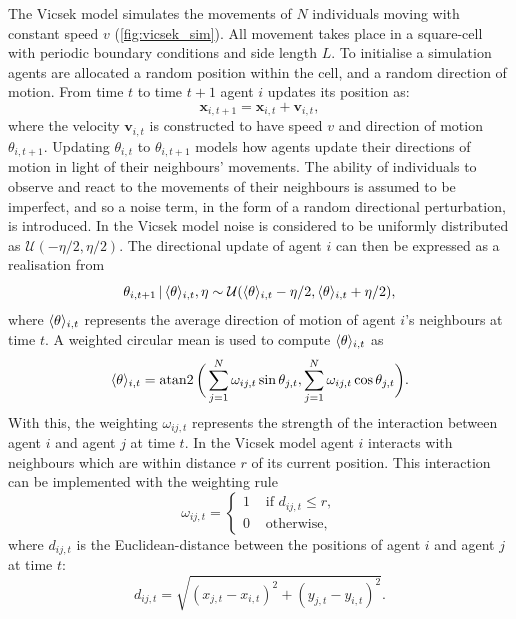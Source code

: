 The Vicsek model simulates the movements of $N$ individuals moving with constant speed $v$
(\cref{fig:vicsek_sim}). All movement takes place in a square-cell with periodic boundary
conditions and side length $L$. To initialise a simulation agents are allocated a random
position within the cell, and a random direction of motion. From time $t$ to time $t+1$
agent $i$ updates its position as:
\begin{equation*}
    \bm{x}_{i, t+1} = \bm{x}_{i, t} + \bm{v}_{i, t},
\end{equation*}
where the velocity $\bm{v}_{i,t}$ is constructed to have speed $v$ and direction of motion
$\theta_{i, t+1}$. Updating $\theta_{i,t}$ to $\theta_{i, t+1}$ models how agents update
their directions of motion in light of their neighbours' movements. The ability of
individuals to observe and react to the movements of their neighbours is assumed to be
imperfect, and so a noise term, in the form of a random directional perturbation, is
introduced. In the Vicsek model noise is considered to be uniformly distributed as
$\mathcal{U}(-\eta/2, \eta/2)$. The directional update of agent $i$ can then be expressed
as a realisation from
\begin{equation}
    \label{eq:vicsek_update}
    \theta_{i, t+1} \,|\, \langle\theta\rangle_{i, t}, \eta \sim
                   \mathcal{U}(\langle\theta\rangle_{i, t} - \eta/2,
                               \langle\theta\rangle_{i, t} + \eta/2),
\end{equation}
where $\langle\theta\rangle_{i, t}$ represents the average direction of motion of
agent $i$'s neighbours at time $t$.  A weighted circular mean is used to
compute $\langle\theta\rangle_{i, t}$ as
\begin{equation}
    \langle\theta\rangle_{i, t} = \operatorname{atan2}\bigg(
        \sum_{j=1}^N \omega_{ij, t} \sin\theta_{j,t},
        \sum_{j=1}^N \omega_{ij, t} \cos\theta_{j,t}
    \bigg).
\end{equation}
With this, the weighting $\omega_{ij, t}$ represents the strength of the interaction
between agent $i$ and agent $j$ at time $t$. In the Vicsek model agent $i$ interacts
with neighbours which are within distance $r$ of its current position. This interaction
can be implemented with the weighting rule
\begin{equation}
    \label{eq:vicsek_interaction}
    \omega_{ij,t} =
    \begin{cases}
        1 & \text{ if } d_{ij, t} \leq r,\\
        0 & \text{ otherwise,}
    \end{cases}
\end{equation}
where $d_{ij,t}$ is the Euclidean-distance between the positions of agent $i$ and agent
$j$ at time $t$:
\begin{equation*}
    d_{ij,t} = \sqrt{(x_{j,t} - x_{i,t})^2 + (y_{j,t} - y_{i,t})^2}.
\end{equation*}

